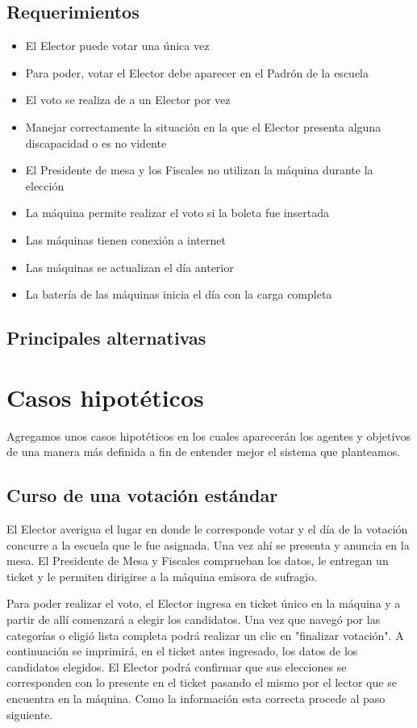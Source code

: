 \documentclass[spanish, 10pt,a4paper]{article}
\numberwithin{equation}{section} %
\begin{document}
\subsection{Requerimientos}
\begin{itemize}
\item El Elector puede votar una única vez
\item Para poder, votar el Elector debe aparecer en el Padrón de la escuela
\item El voto se realiza de a un Elector por vez
\item Manejar correctamente la situación en la que el Elector presenta alguna discapacidad o es no vidente
\item El Presidente de mesa y los Fiscales no utilizan la máquina durante la elección
\item La máquina permite realizar el voto si la boleta fue insertada
\item Las máquinas tienen conexión a internet
\item Las máquinas se actualizan el día anterior
\item La batería de las máquinas inicia el día con la carga completa
\end{itemize}

\subsection{Principales alternativas}

\section{Casos hipotéticos}

Agregamos unos casos hipotéticos en los cuales aparecerán los agentes y objetivos de una manera más definida a fin de entender mejor el sistema que planteamos.

\subsection{Curso de una votación estándar}
	El Elector averigua el lugar en donde le corresponde votar y el día de la votación concurre a la escuela que le fue asignada. Una vez ahí se presenta y anuncia en la mesa. El Presidente de Mesa y Fiscales comprueban los datos, le entregan un ticket y le permiten dirigirse a la máquina emisora de sufragio. 

	Para poder realizar el voto, el Elector ingresa en ticket único en la máquina y a partir de allí comenzará a elegir los candidatos. Una vez que navegó por las categorías o eligió lista completa podrá  realizar un clic en "finalizar votación". A continuación se imprimirá, en el ticket antes ingresado, los datos de los candidatos elegidos. El Elector podrá confirmar que sus elecciones se corresponden con lo presente en el ticket pasando el mismo por el lector que se encuentra en la máquina. Como la información esta correcta procede al paso siguiente.
\end{document}
